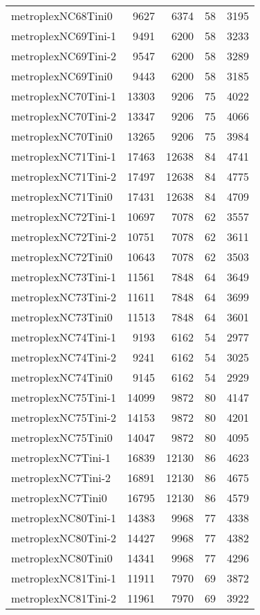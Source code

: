 \begin{longtable}{lrrrr}
metroplexNC68Tini0 & 9627 & 6374 & 58 & 3195 \\
metroplexNC69Tini-1 & 9491 & 6200 & 58 & 3233 \\
metroplexNC69Tini-2 & 9547 & 6200 & 58 & 3289 \\
metroplexNC69Tini0 & 9443 & 6200 & 58 & 3185 \\
metroplexNC70Tini-1 & 13303 & 9206 & 75 & 4022 \\
metroplexNC70Tini-2 & 13347 & 9206 & 75 & 4066 \\
metroplexNC70Tini0 & 13265 & 9206 & 75 & 3984 \\
metroplexNC71Tini-1 & 17463 & 12638 & 84 & 4741 \\
metroplexNC71Tini-2 & 17497 & 12638 & 84 & 4775 \\
metroplexNC71Tini0 & 17431 & 12638 & 84 & 4709 \\
metroplexNC72Tini-1 & 10697 & 7078 & 62 & 3557 \\
metroplexNC72Tini-2 & 10751 & 7078 & 62 & 3611 \\
metroplexNC72Tini0 & 10643 & 7078 & 62 & 3503 \\
metroplexNC73Tini-1 & 11561 & 7848 & 64 & 3649 \\
metroplexNC73Tini-2 & 11611 & 7848 & 64 & 3699 \\
metroplexNC73Tini0 & 11513 & 7848 & 64 & 3601 \\
metroplexNC74Tini-1 & 9193 & 6162 & 54 & 2977 \\
metroplexNC74Tini-2 & 9241 & 6162 & 54 & 3025 \\
metroplexNC74Tini0 & 9145 & 6162 & 54 & 2929 \\
metroplexNC75Tini-1 & 14099 & 9872 & 80 & 4147 \\
metroplexNC75Tini-2 & 14153 & 9872 & 80 & 4201 \\
metroplexNC75Tini0 & 14047 & 9872 & 80 & 4095 \\
metroplexNC7Tini-1 & 16839 & 12130 & 86 & 4623 \\
metroplexNC7Tini-2 & 16891 & 12130 & 86 & 4675 \\
metroplexNC7Tini0 & 16795 & 12130 & 86 & 4579 \\
metroplexNC80Tini-1 & 14383 & 9968 & 77 & 4338 \\
metroplexNC80Tini-2 & 14427 & 9968 & 77 & 4382 \\
metroplexNC80Tini0 & 14341 & 9968 & 77 & 4296 \\
metroplexNC81Tini-1 & 11911 & 7970 & 69 & 3872 \\
metroplexNC81Tini-2 & 11961 & 7970 & 69 & 3922 \\

\end{longtable}
